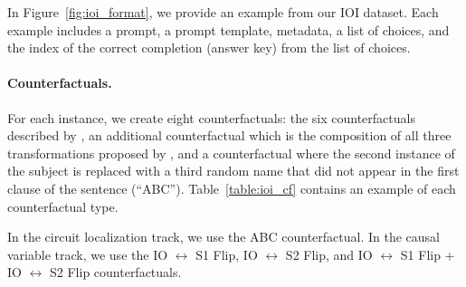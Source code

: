\documentclass{article}
\theoremstyle{plain}
\theoremstyle{definition}
\theoremstyle{remark}
\begin{document}
In Figure~\ref{fig:ioi_format}, we provide an example from our IOI dataset.
Each example includes a prompt, a prompt template, metadata, a list of choices, and the index of the correct completion (answer key) from the list of choices.

\paragraph{Counterfactuals.}
For each instance, we create eight counterfactuals: the six counterfactuals described by \citet{wang2022interpretability}, an additional counterfactual which is the composition of all three transformations proposed by \citet{wang2022interpretability}, and a counterfactual where the second instance of the subject is replaced with a third random name that did not appear in the first clause of the sentence (``ABC''). Table~\ref{table:ioi_cf} contains an example of each counterfactual type.

In the circuit localization track, we use the ABC counterfactual. In the causal variable track, we use the IO $\leftrightarrow$ S1 Flip, IO $\leftrightarrow$ S2 Flip, and IO $\leftrightarrow$ S1 Flip + IO $\leftrightarrow$ S2 Flip counterfactuals.
\end{document}
